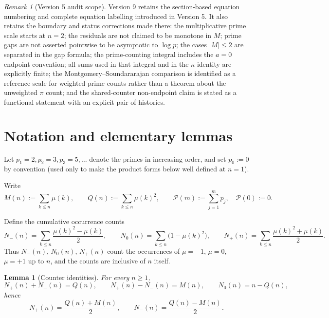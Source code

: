 \documentclass[11pt]{amsart}
\numberwithin{equation}{section}
\theoremstyle{plain}
\newtheorem{lemma}[theorem]{Lemma}
\theoremstyle{definition}
\theoremstyle{remark}
\newtheorem{remark}[theorem]{Remark}
\newcommand{\mob}{\mu}
\newcommand{\Mert}{M}
\newcommand{\Sq}{Q}
\newcommand{\PS}{\mathcal P}
\begin{document}
\begin{remark}[Version 5 audit scope]
\label{rem:v5-audit}
Version 9 retains the section-based equation numbering and complete equation labelling
introduced in Version 5. It also retains the boundary and status corrections made there: the
multiplicative prime scale starts at $n=2$; the residuals are not claimed to be
monotone in $M$; prime gaps are not asserted pointwise to be asymptotic to
$\log p$; the cases $|M|\le2$ are separated in the gap formula; the
prime-counting integral includes the $a=0$ endpoint convention; all sums used
in that integral and in the $\kappa$ identity are explicitly finite; the
Montgomery--Soundararajan comparison is identified as a reference scale for
weighted prime counts rather than a theorem about the unweighted $\pi$ count;
and the shared-counter non-endpoint claim is stated as a functional statement
with an explicit pair of histories.
\end{remark}

\section{Notation and elementary lemmas}
\label{sec:notation}

Let $p_1=2,p_2=3,p_3=5,\ldots$ denote the primes in increasing order, and set
$p_0:=0$ by convention (used only to make the product forms below well defined
at $n=1$).

Write
\begin{equation}
\label{eq:basic-definitions}
\Mert(n):=\sum_{k\le n}\mob(k),
\qquad
\Sq(n):=\sum_{k\le n}\mob(k)^2 ,
\qquad
\PS(m):=\sum_{j=1}^{m}p_j ,\quad \PS(0):=0 .
\end{equation}

Define the cumulative occurrence counts
\begin{equation}
\label{eq:occurrence-counts}
N_-(n)=\sum_{k\le n}\frac{\mob(k)^2-\mob(k)}2,
\qquad
N_0(n)=\sum_{k\le n}\bigl(1-\mob(k)^2\bigr),
\qquad
N_+(n)=\sum_{k\le n}\frac{\mob(k)^2+\mob(k)}2 .
\end{equation}
Thus $N_-(n)$, $N_0(n)$, $N_+(n)$ count the occurrences of $\mob=-1$, $\mob=0$,
$\mob=+1$ up to $n$, and the counts are inclusive of $n$ itself.

\begin{lemma}[Counter identities]\label{lem:counters}
For every $n\ge1$,
\begin{equation}
\label{eq:counter-identities}
N_+(n)+N_-(n)=\Sq(n),
\qquad
N_+(n)-N_-(n)=\Mert(n),
\qquad
N_0(n)=n-\Sq(n),
\end{equation}
hence
\begin{equation}
\label{eq:counter-solutions}
N_+(n)=\frac{\Sq(n)+\Mert(n)}2,
\qquad
N_-(n)=\frac{\Sq(n)-\Mert(n)}2 .
\end{equation}
\end{lemma}
\end{document}
